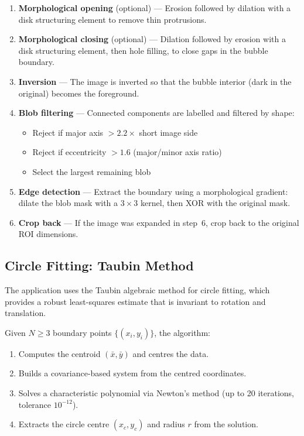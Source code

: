 \documentclass[11pt, letterpaper]{article}
\begin{document}
\begin{enumerate}
    \item \textbf{Morphological opening} (optional) --- Erosion followed by
          dilation with a disk structuring element to remove thin protrusions.

    \item \textbf{Morphological closing} (optional) --- Dilation followed by
          erosion with a disk structuring element, then hole filling, to close
          gaps in the bubble boundary.

    \item \textbf{Inversion} --- The image is inverted so that the bubble
          interior (dark in the original) becomes the foreground.

    \item \textbf{Blob filtering} --- Connected components are labelled and
          filtered by shape:
          \begin{itemize}
              \item Reject if major axis $> 2.2 \times$ short image side
              \item Reject if eccentricity $> 1.6$ (major/minor axis ratio)
              \item Select the largest remaining blob
          \end{itemize}

    \item \textbf{Edge detection} --- Extract the boundary using a
          morphological gradient: dilate the blob mask with a $3 \times 3$
          kernel, then XOR with the original mask.

    \item \textbf{Crop back} --- If the image was expanded in step~6, crop
          back to the original ROI dimensions.
\end{enumerate}

\subsection{Circle Fitting: Taubin Method}

The application uses the Taubin algebraic method for circle fitting, which
provides a robust least-squares estimate that is invariant to rotation and
translation.

Given $N \geq 3$ boundary points $\{(x_i, y_i)\}$, the algorithm:

\begin{enumerate}
    \item Computes the centroid $(\bar{x}, \bar{y})$ and centres the data.
    \item Builds a covariance-based system from the centred coordinates.
    \item Solves a characteristic polynomial via Newton's method (up to 20
          iterations, tolerance $10^{-12}$).
    \item Extracts the circle centre $(x_c, y_c)$ and radius $r$ from the
          solution.
\end{enumerate}
\end{document}
